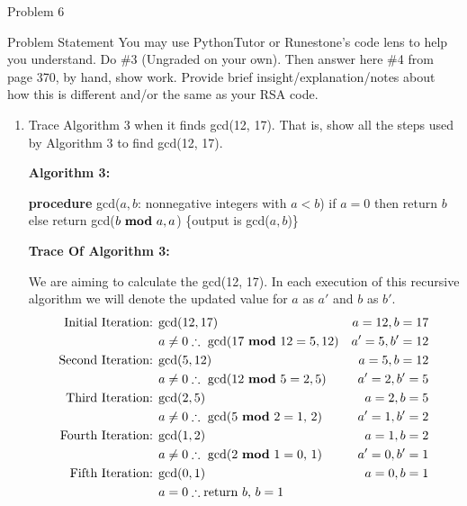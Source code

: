 \begin{problem}{Problem 6}
    \begin{statement}{Problem Statement}
        You may use PythonTutor or Runestone's code lens to help you understand. Do \#3 (Ungraded on your own). Then answer here \#4 from page 370, by hand, show work. Provide brief insight/explanation/notes 
        about how this is different and/or the same as your RSA code.
    \end{statement}

    \begin{highlight}[Solution - \#4]
        \begin{enumerate}[label = \arabic*., start = 4]
            \item Trace Algorithm 3 when it finds gcd(12, 17). That is, show all the steps used by Algorithm 3 to find gcd(12, 17). \vspace*{1em}
            
            \noindent \textbf{Algorithm 3:} \vspace*{1em}

            \textbf{procedure} gcd($a, b$: nonnegative integers with $a < b$) \newline
            if $a = 0$ then return $b$ \newline
            else return gcd($b \text{ \textbf{mod} } a, a$) \newline
            \{output is gcd($a, b$)\} \newline

            \noindent \textbf{Trace Of Algorithm 3:} \vspace*{1em}

            We are aiming to calculate the gcd(12, 17). In each execution of this recursive algorithm we will denote the updated value for $a$ as $a'$ and $b$ as $b'$.
            \begin{align*}
                \text{Initial Iteration: } & \text{gcd($12,17$)} & a = 12, b = 17 \\
                & a \neq 0 \therefore \text{ gcd($17 \text{ \textbf{mod} } 12 = 5, 12$)} & a' = 5, b' = 12 \\
                \text{Second Iteration: } & \text{gcd($5,12$)} & a = 5, b = 12 \\
                & a \neq 0 \therefore \text{ gcd($12 \text{ \textbf{mod} } 5 = 2, 5$)} & a' = 2, b' = 5 \\
                \text{Third Iteration: } & \text{gcd($2,5$)} & a = 2, b = 5 \\
                & a \neq 0 \therefore \text{ gcd($5 \text{ \textbf{mod} } 2 = 1$, 2)} & a' = 1, b' = 2 \\
                \text{Fourth Iteration: } & \text{gcd($1,2$)} & a = 1, b = 2 \\
                & a \neq 0 \therefore \text{ gcd($2 \text{ \textbf{mod} } 1 = 0$, 1)} & a' = 0, b' = 1 \\
                \text{Fifth Iteration: } & \text{gcd($0,1$)} & a = 0, b = 1 \\
                & a = 0 \therefore \text{return $b$, $b = 1$} &
            \end{align*}


\end{enumerate}
\end{highlight}
\end{problem}
